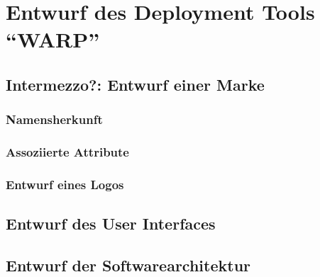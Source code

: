 \chapter{Entwurf des Deployment Tools ``WARP''}


\section{Intermezzo?: Entwurf einer Marke}

\subsection{Namensherkunft}

\subsection{Assoziierte Attribute}

\subsection{Entwurf eines Logos}

\section{Entwurf des User Interfaces}

\section{Entwurf der Softwarearchitektur}
